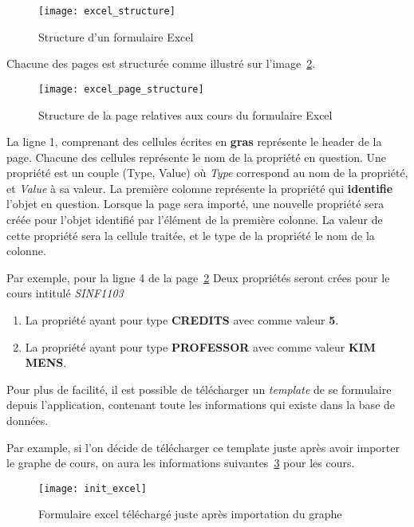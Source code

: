 \begin{figure}[H]
\centering
\caption{Structure d'un formulaire Excel}
\label{fig:excel_structure}
\texttt{[image: excel\_structure]}
\end{figure}

Chacune des pages est structurée comme illustré sur l'image~\ref{fig:excel_page_structure}. 

\begin{figure}[H]
\centering
\caption{Structure de la page relatives aux cours du formulaire Excel}
\label{fig:excel_page_structure}
\texttt{[image: excel\_page\_structure]}
\end{figure}

La ligne 1, comprenant des cellules écrites en \textbf{gras} représente le header de la page. Chacune des cellules représente le nom de la propriété en question. Une propriété est un couple (Type, Value) où \textit{Type} correspond au nom de la propriété, et \textit{Value} à sa valeur. La première colomne représente la propriété qui \textbf{identifie} l'objet en question. Lorsque la page sera importé, une nouvelle propriété sera créée pour l'objet identifié par l'élément de la première colonne. La valeur de cette propriété sera la cellule traitée, et le type de la propriété le nom de la colonne. 

Par exemple, pour la ligne 4 de la page~\ref{fig:excel_page_structure}
Deux propriétés seront crées pour le cours intitulé \textit{SINF1103}
\begin{enumerate}
\item La propriété ayant pour type \textbf{CREDITS} avec comme valeur \textbf{5}.
\item La propriété ayant pour type \textbf{PROFESSOR} avec comme valeur \textbf{KIM MENS}.
\end{enumerate}

Pour plus de facilité, il est possible de télécharger un \textit{template} de se formulaire depuis l'application, contenant toute les informations qui existe dans la base de données. 

Par example, si l'on décide de télécharger ce template juste après avoir importer le graphe de cours, on aura les informations suivantes~\ref{fig:init_excel} pour les cours. 

\begin{figure}[H]
\caption{Formulaire excel téléchargé juste après importation du graphe}
\label{fig:init_excel}
\texttt{[image: init\_excel]}
\end{figure}

